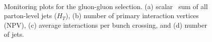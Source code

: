 \begin{figure}[htb]
 \centering
 \\
 \caption{Monitoring plots for %
 the gluon-gluon selection. (a) scalar \pt~sum of all parton-level jets ($H_T$), %
 (b) number of primary interaction vertices (NPV),
 (c) average interactions per bunch crossing, and 
 (d) number of jets.}
 \label{fig:GGmonitoring1}
\end{figure}

